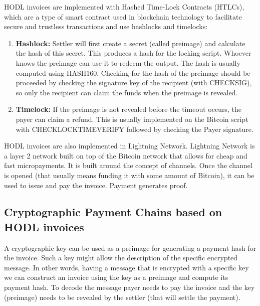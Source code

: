 \documentclass{article}
\begin{document}
HODL invoices are implemented with Hashed Time-Lock Contracts (HTLCs), which are a type of smart contract used in blockchain technology to facilitate secure and trustless transactions and use hashlocks and timelocks:

\begin{enumerate}
	\item \textbf{Hashlock:} Settler will first create a secret (called preimage) and calculate the hash of this secret. This produces a hash for the locking script. Whoever knows the preimage can use it to redeem the output. The hash is usually computed using HASH160. Checking for the hash of the preimage should be proceeded by checking the signature key of the recipient (with CHECKSIG), so only the recipient can claim the funds when the preimage is revealed.
	\item \textbf{Timelock:} If the preimage is not revealed before the timeout occurs, the payer can claim a refund. This is usually implemented on the Bitcoin script with CHECKLOCKTIMEVERIFY followed by checking the Payer signature.
\end{enumerate}

HODL invoices are also implemented in Lightning Network. Lightning Network is a layer 2 network built on top of the Bitcoin network that allows for cheap and fast micropayments. It is built around the concept of channels. Once the channel is opened (that usually means funding it with some amount of Bitcoin), it can be used to issue and pay the invoice. Payment generates proof. 

\subsection{Cryptographic Payment Chains based on HODL invoices}
A cryptographic key can be used as a preimage for generating a payment hash for the invoice. Such a key might allow the description of the specific encrypted message. In other words, having a message that is encrypted with a specific key we can construct an invoice using the key as a preimage and compute its payment hash. To decode the message payer needs to pay the invoice and the key (preimage) needs to be revealed by the settler (that will settle the payment).
\end{document}
